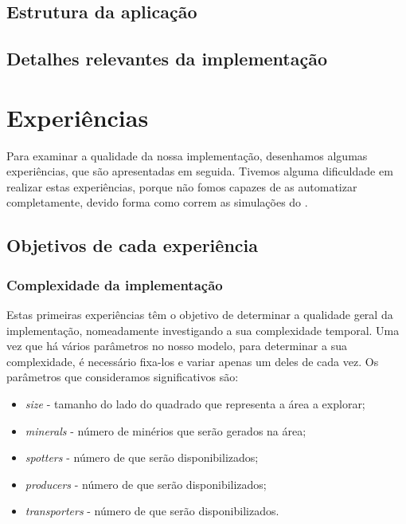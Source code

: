 \documentclass[12pt]{report}
\begin{document}
\section{Estrutura da aplicação}


\section{Detalhes relevantes da implementação}


\chapter{Experiências}

Para examinar a qualidade da nossa implementação, desenhamos algumas experiências, que são apresentadas em seguida. Tivemos alguma dificuldade em realizar estas experiências, porque não fomos capazes de as automatizar completamente, devido forma como correm as simulações do \repast.

\section{Objetivos de cada experiência}

\subsection{Complexidade da implementação}

Estas primeiras experiências têm o objetivo de determinar a qualidade geral da implementação, nomeadamente investigando a sua complexidade temporal. Uma vez que há vários parâmetros no nosso modelo, para determinar a sua complexidade, é necessário fixa-los e variar apenas um deles de cada vez. Os parâmetros que consideramos significativos são:
\begin{itemize}
	\item \emph{size} - tamanho do lado do quadrado que representa a área a explorar;
	\item \emph{minerals} - número de minérios que serão gerados na área;
	\item \emph{spotters} - número de \spotters que serão disponibilizados;
	\item \emph{producers} - número de \producers que serão disponibilizados;
	\item \emph{transporters} - número de \transporters que serão disponibilizados.
\end{itemize}
\end{document}
